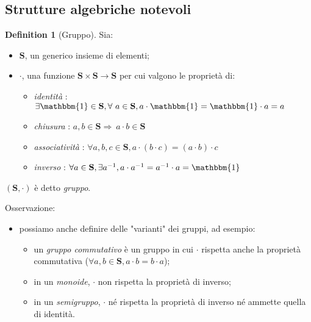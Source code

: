 \documentclass[12pt, a4paper]{report}
\theoremstyle{definition}
\newtheorem{definition}{Definition}[section]
\begin{document}
			\subsection{Strutture algebriche notevoli}
				\begin{definition}[Gruppo]
					Sia:
						\begin{itemize}
							\item $\mathbf{S}$, un generico insieme di elementi;
							\item $\cdot$, una funzione $\mathbf{S}\times\mathbf{S}\rightarrow \mathbf{S}$ per cui valgono le proprietà di:
								\begin{itemize}
									\item \emph{identità} : $\exists\mathbbm{1}\in \mathbf{S},\forall\ a\in \mathbf{S},a\cdot\mathbbm{1}=\mathbbm{1}\cdot a=a$
									\item \emph{chiusura} : $a,b\in \mathbf{S}\Rightarrow\ a\cdot b\in \mathbf{S}$
									\item \emph{associatività} : $\forall a,b,c\in \mathbf{S},a\cdot \left(b\cdot c\right)=\left(a\cdot b\right)\cdot c$
									\item \emph{inverso} : $\forall a\in \mathbf{S},\exists a^{-1},a\cdot a^{-1}=a^{-1}\cdot a=\mathbbm{1}$
								\end{itemize}
						\end{itemize}
					\begin{center}
						$\left(\mathbf{S},\cdot\right)$ è detto \emph{gruppo}.
					\end{center}
					Osservazione:
						\begin{itemize}
							\item possiamo anche definire delle "varianti" dei gruppi, ad esempio:
							\begin{itemize}
								\item un \emph{gruppo commutativo} è un gruppo in cui $\cdot$ rispetta anche la proprietà commutativa ($\forall a,b\in \mathbf{S},a\cdot b=b\cdot a$);
								\item in un \emph{monoide}, $\cdot$ non rispetta la proprietà di inverso;
								\item in un \emph{semigruppo}, $\cdot$ né rispetta la proprietà di inverso né ammette quella di identità.
							\end{itemize}
						\end{itemize}
				\end{definition}
\end{document}
